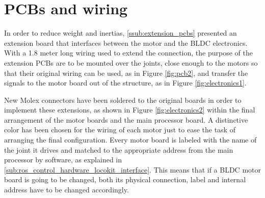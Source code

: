 \section{PCBs and wiring} %
\label{sec:pcbs_and_wiring}
In order to reduce weight and inertias, \ref{ssub:extension_pcbs} presented an extension board that interfaces between the motor and the BLDC electronics.
With a 1.8 meter long wiring used to extend the connection, the purpose of the extension PCBs are to be mounted over the joints, close enough to the motors so that their original wiring can be used, as in Figure \ref{fig:pcb2}, and transfer the signals to the motor board out of the structure, as in Figure \ref{fig:electronics1}.

New Molex connectors have been soldered to the original boards in order to implement these extensions, as shown in Figure \ref{fig:electronics2} within the final arrangement of the motor boards and the main processor board.
A distinctive color has been chosen for the wiring of each motor just to ease the task of arranging the final configuration.
Every motor board is labeled with the name of the joint it drives and matched to the appropriate address from the main processor by software, as explained in \ref{sub:ros_control_hardware_locokit_interface}.
This means that if a BLDC motor board is going to be changed, both its physical connection, label and internal address have to be changed accordingly.


